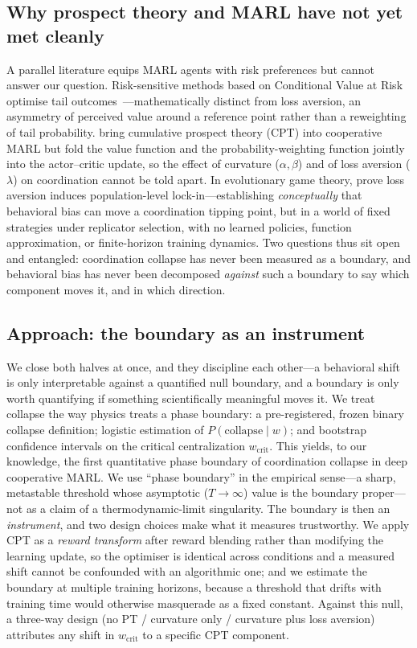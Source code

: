 \documentclass[letterpaper]{article}
\theoremstyle{plain}
\newcommand{\wcrit}{w_{\mathrm{crit}}}
\begin{document}
\subsection{Why prospect theory and MARL have not yet met cleanly}
A parallel literature equips MARL agents with risk preferences but cannot answer
our question. Risk-sensitive methods based on Conditional Value at Risk optimise
tail outcomes~\citep{qiu2021rmix,xie2023riskq}---mathematically distinct from
loss aversion, an asymmetry of perceived value around a reference point rather
than a reweighting of tail probability. \citet{lalmohammed2025} bring cumulative
prospect theory (CPT) into cooperative MARL but fold the value function and the
probability-weighting function jointly into the actor--critic update, so the
effect of curvature ($\alpha,\beta$) and of loss aversion ($\lambda$) on
coordination cannot be told apart. In evolutionary game theory,
\citet{mengesha2025} prove loss aversion induces population-level
lock-in---establishing \emph{conceptually} that behavioral bias can move a
coordination tipping point, but in a world of fixed strategies under replicator
selection, with no learned policies, function approximation, or finite-horizon
training dynamics. Two questions thus sit open and entangled: coordination
collapse has never been measured as a boundary, and behavioral bias has never
been decomposed \emph{against} such a boundary to say which component moves it,
and in which direction.

\subsection{Approach: the boundary as an instrument}
We close both halves at once, and they discipline each other---a behavioral
shift is only interpretable against a quantified null boundary, and a boundary is
only worth quantifying if something scientifically meaningful moves it. We treat
collapse the way physics treats a phase boundary: a pre-registered, frozen binary
collapse definition; logistic estimation of $P(\mathrm{collapse}\mid w)$; and
bootstrap confidence intervals on the critical centralization $\wcrit$. This
yields, to our knowledge, the first quantitative phase boundary of coordination
collapse in deep cooperative MARL. We use ``phase boundary'' in the empirical
sense---a sharp, metastable threshold whose asymptotic ($T\!\to\!\infty$) value
is the boundary proper---not as a claim of a thermodynamic-limit singularity.
The boundary is then an \emph{instrument}, and two design choices make what it
measures trustworthy. We apply CPT as a \emph{reward transform} after reward
blending rather than modifying the learning update, so the optimiser is identical
across conditions and a measured shift cannot be confounded with an algorithmic
one; and we estimate the boundary at multiple training horizons, because a
threshold that drifts with training time would otherwise masquerade as a fixed
constant. Against this null, a three-way design (no PT / curvature only /
curvature plus loss aversion) attributes any shift in $\wcrit$ to a specific CPT
component.
\end{document}
